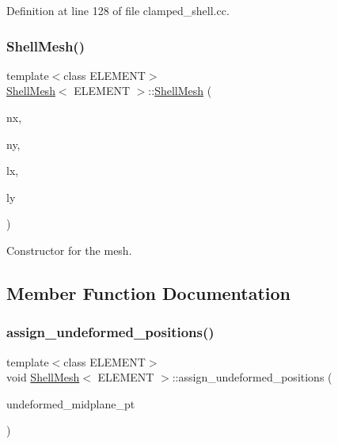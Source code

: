 Definition at line 128 of file clamped\+\_\+shell.\+cc.

\mbox{\label{classShellMesh_a6ce8404f69fa3f4c10dac5c18cff0699}} 
\subsubsection{\texorpdfstring{Shell\+Mesh()}{ShellMesh()}\hspace{0.1cm}{\footnotesize\ttfamily [2/2]}}
{\footnotesize\ttfamily template$<$class E\+L\+E\+M\+E\+NT$>$ \\
\hyperlink{classShellMesh}{Shell\+Mesh}$<$ E\+L\+E\+M\+E\+NT $>$\+::\hyperlink{classShellMesh}{Shell\+Mesh} (\begin{DoxyParamCaption}\item[{const unsigned \&}]{nx,  }\item[{const unsigned \&}]{ny,  }\item[{const double \&}]{lx,  }\item[{const double \&}]{ly }\end{DoxyParamCaption})}



Constructor for the mesh. 



\subsection{Member Function Documentation}
\mbox{\label{classShellMesh_a3576870121fad30d0f99588ea8082ca1}} 
\subsubsection{\texorpdfstring{assign\+\_\+undeformed\+\_\+positions()}{assign\_undeformed\_positions()}\hspace{0.1cm}{\footnotesize\ttfamily [1/2]}}
{\footnotesize\ttfamily template$<$class E\+L\+E\+M\+E\+NT$>$ \\
void \hyperlink{classShellMesh}{Shell\+Mesh}$<$ E\+L\+E\+M\+E\+NT $>$\+::assign\+\_\+undeformed\+\_\+positions (\begin{DoxyParamCaption}\item[{Geom\+Object $\ast$const \&}]{undeformed\+\_\+midplane\+\_\+pt }\end{DoxyParamCaption})}



